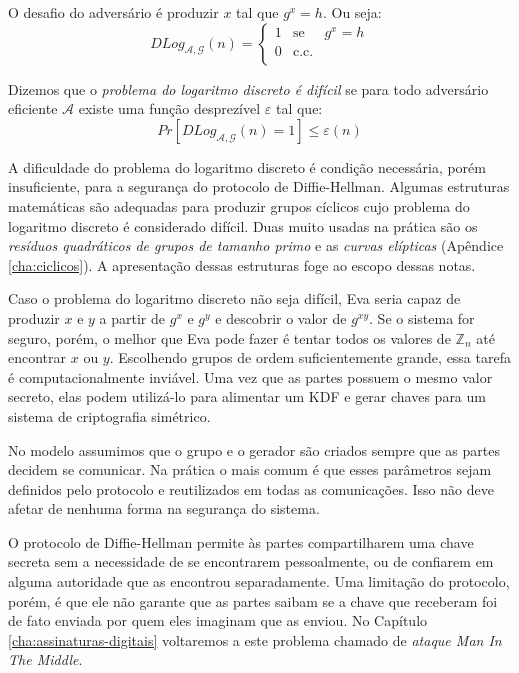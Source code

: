 O desafio do adversário é produzir $x$ tal que $g^x = h$.
Ou seja:
\begin{displaymath}
  DLog_{\mathcal{A}, \mathcal{G}}(n) = \left\{
    \begin{array}{lcl}
      1 & \textrm{se} & g^x = h\\
      0 & \textrm{c.c.} &\\
    \end{array}
    \right.
\end{displaymath}

Dizemos que o {\em problema do logaritmo discreto é difícil} se para todo adversário eficiente $\mathcal{A}$ existe uma função desprezível $\varepsilon$ tal que:
\begin{displaymath}
  Pr[DLog_{\mathcal{A}, \mathcal{G}}(n) = 1] \leq \varepsilon(n)
\end{displaymath}

A dificuldade do problema do logaritmo discreto é condição necessária, porém insuficiente, para a segurança do protocolo de Diffie-Hellman.
Algumas estruturas matemáticas são adequadas para produzir grupos cíclicos cujo problema do logaritmo discreto é considerado difícil.
Duas muito usadas na prática são os {\em resíduos quadráticos de grupos de tamanho primo} e as {\em curvas elípticas} (Apêndice \ref{cha:ciclicos}).
A apresentação dessas estruturas foge ao escopo dessas notas.


Caso o problema do logaritmo discreto não seja difícil, Eva seria capaz de produzir $x$ e $y$ a partir de $g^x$ e $g^y$ e descobrir o valor de $g^{xy}$.
Se o sistema for seguro, porém, o melhor que Eva pode fazer é tentar todos os valores de $\mathbb{Z}_n$ até encontrar $x$ ou $y$.
Escolhendo grupos de ordem suficientemente grande, essa tarefa é computacionalmente inviável.
Uma vez que as partes possuem o mesmo valor secreto, elas podem utilizá-lo para alimentar um KDF e gerar chaves para um sistema de criptografia simétrico.

No modelo assumimos que o grupo e o gerador são criados sempre que as partes decidem se comunicar.
Na prática o mais comum é que esses parâmetros sejam definidos pelo protocolo e reutilizados em todas as comunicações.
Isso não deve afetar de nenhuma forma na segurança do sistema.

O protocolo de Diffie-Hellman permite às partes compartilharem uma chave secreta sem a necessidade de se encontrarem pessoalmente, ou de confiarem em alguma autoridade que as encontrou separadamente.
Uma limitação do protocolo, porém, é que ele não garante que as partes saibam se a chave que receberam foi de fato enviada por quem eles imaginam que as enviou.
No Capítulo \ref{cha:assinaturas-digitais} voltaremos a este problema chamado de {\em ataque Man In The Middle}.

